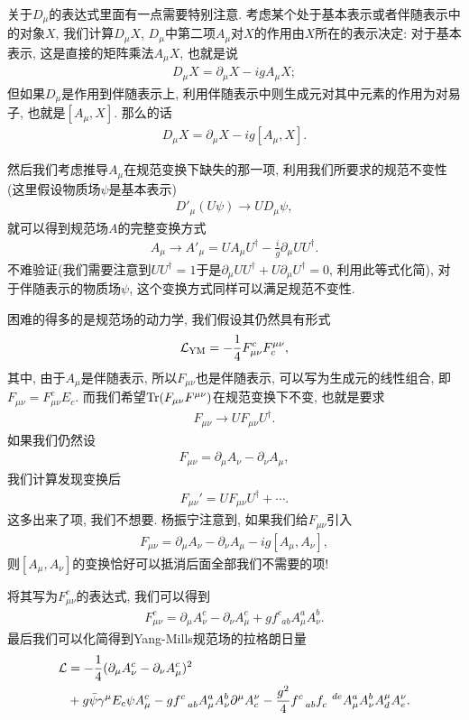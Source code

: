 关于$D_\mu$的表达式里面有一点需要特别注意. 考虑某个处于基本表示或者伴随表示中的对象$X$, 我们计算$D_\mu X$, $D_\mu$中第二项$A_\mu$对$X$的作用由$X$所在的表示决定: 对于基本表示, 这是直接的矩阵乘法$A_\mu X$, 也就是说
\begin{align}
    D_\mu X=\partial_\mu X-igA_\mu X;
\end{align}
但如果$D_\mu$是作用到伴随表示上, 利用伴随表示中则生成元对其中元素的作用为对易子, 也就是$[A_\mu, X]$. 那么的话
\begin{align}
    D_\mu X=\partial_\mu X-ig[A_\mu, X].
\end{align}

然后我们考虑推导$A_\mu$在规范变换下缺失的那一项, 利用我们所要求的规范不变性(这里假设物质场$\psi$是基本表示)
\begin{align}
    D'_\mu(U\psi)\to U D_\mu\psi,
\end{align}
就可以得到规范场$A$的完整变换方式
\begin{align}
    A_\mu\to A'_\mu=UA_\mu U^\dagger-\frac ig\partial_\mu U U^\dagger.
\end{align}
不难验证(我们需要注意到$UU^\dagger=1$于是$\partial_\mu UU^\dagger+U\partial_\mu U^\dagger=0$, 利用此等式化简), 对于伴随表示的物质场$\psi$, 这个变换方式同样可以满足规范不变性.

困难的得多的是规范场的动力学, 我们假设其仍然具有形式
\begin{align}
    \mathcal L_{\rm{YM}}=-\frac14F_{\mu\nu}^cF^{\mu\nu}_c, 
\end{align}
其中, 由于$A_\mu$是伴随表示, 所以$F_{\mu\nu}$也是伴随表示, 可以写为生成元的线性组合, 即$F_{\mu\nu}=F_{\mu\nu}^cE_c$. 而我们希望$\Tr(F_{\mu\nu}F^{\mu\nu})$在规范变换下不变, 也就是要求
\begin{align}
    F_{\mu\nu}\to UF_{\mu\nu}U^\dagger.
\end{align}
如果我们仍然设
\begin{align}
    F_{\mu\nu}=\partial_\mu A_\nu-\partial_\nu A_\mu,
\end{align}
我们计算发现变换后
\begin{align}
    F_{\mu\nu}'=UF_{\mu\nu}U^\dagger+\cdots.
\end{align}
这多出来了项, 我们不想要. 杨振宁注意到, 如果我们给$F_{\mu\nu}$引入
\begin{align}
    F_{\mu\nu}=\partial_\mu A_\nu-\partial_\nu A_\mu-ig[A_\mu, A_\nu],
\end{align}
则$[A_\mu, A_\nu]$的变换恰好可以抵消后面全部我们不需要的项!

将其写为$F^c_{\mu\nu}$的表达式, 我们可以得到
\begin{align}
    F_{\mu\nu}^c=\partial_\mu A_\nu^c-\partial_\nu A_\mu^c+gf^c_{~~ab}A_\mu^a A_\nu^b.
\end{align}
最后我们可以化简得到Yang-Mills规范场的拉格朗日量
\begin{align}
    \mathcal L&=-\frac14(\partial_\mu A_\nu^c-\partial_\nu A_\mu^c)^2\notag\\
    &+g\bar\psi\gamma^\mu E_c\psi A_\mu^c-g f^c_{~~ab}A_\mu^aA_\nu^b\partial^\mu A^\nu_c-\frac{g^2}4 f^c_{~~ab}f_c^{~~de} A^a_\mu A_\nu^bA^\mu_dA^\nu_e.
\end{align}

